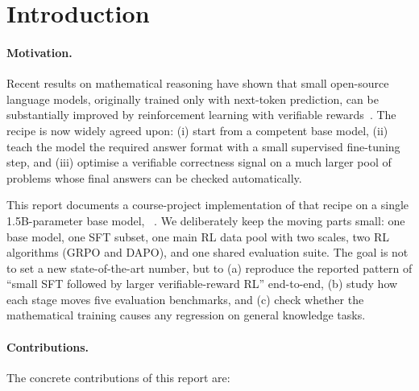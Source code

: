 \section{Introduction}
\label{sec:intro}

\paragraph{Motivation.}
Recent results on mathematical reasoning have shown that small open-source
language models, originally trained only with next-token prediction, can be
substantially improved by reinforcement learning with verifiable
rewards~\cite{deepseekmath, deepseekr1, dapo}. The recipe is now widely
agreed upon: (i) start from a competent base model, (ii) teach the model the
required answer format with a small supervised fine-tuning step, and
(iii) optimise a verifiable correctness signal on a much larger pool of
problems whose final answers can be checked automatically.

This report documents a course-project implementation of that recipe on a
single 1.5B-parameter base model, ~\cite{qwen25}.
We deliberately keep the moving parts small: one base model, one SFT subset,
one main RL data pool with two scales, two RL algorithms (GRPO and DAPO),
and one shared evaluation suite. The goal is not to set a new
state-of-the-art number, but to (a) reproduce the reported pattern of
``small SFT followed by larger verifiable-reward RL'' end-to-end, (b) study
how each stage moves five evaluation benchmarks, and (c) check whether the
mathematical training causes any regression on general knowledge tasks.

\paragraph{Contributions.}
The concrete contributions of this report are:

